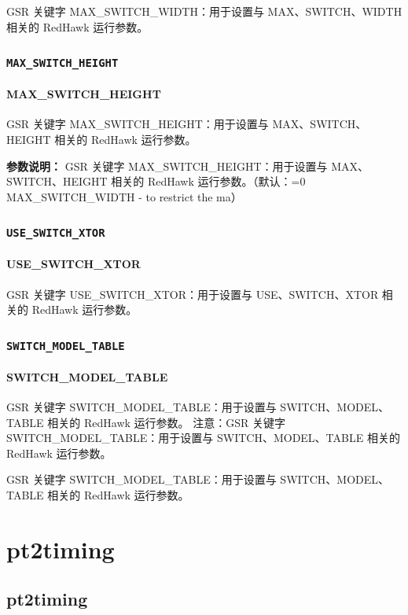 GSR 关键字 MAX_SWITCH_WIDTH：用于设置与 MAX、SWITCH、WIDTH 相关的 RedHawk 运行参数。

\subsubsection{\texttt{MAX_SWITCH_HEIGHT}}
\paragraph*{MAX_SWITCH_HEIGHT}

GSR 关键字 MAX_SWITCH_HEIGHT：用于设置与 MAX、SWITCH、HEIGHT 相关的 RedHawk 运行参数。

\textbf{参数说明：}
GSR 关键字 MAX\_SWITCH\_HEIGHT：用于设置与 MAX、SWITCH、HEIGHT 相关的 RedHawk 运行参数。（默认：=0 MAX\_SWITCH\_WIDTH - to restrict the ma）

\subsubsection{\texttt{USE_SWITCH_XTOR}}
\paragraph*{USE_SWITCH_XTOR}

GSR 关键字 USE_SWITCH_XTOR：用于设置与 USE、SWITCH、XTOR 相关的 RedHawk 运行参数。

\subsubsection{\texttt{SWITCH_MODEL_TABLE}}
\paragraph*{SWITCH_MODEL_TABLE}

GSR 关键字 SWITCH_MODEL_TABLE：用于设置与 SWITCH、MODEL、TABLE 相关的 RedHawk 运行参数。 注意：GSR 关键字 SWITCH_MODEL_TABLE：用于设置与 SWITCH、MODEL、TABLE 相关的 RedHawk 运行参数。

\begin{noteBox}
GSR 关键字 SWITCH\_MODEL\_TABLE：用于设置与 SWITCH、MODEL、TABLE 相关的 RedHawk 运行参数。
\end{noteBox}

\section{pt2timing}
\subsection*{pt2timing}

